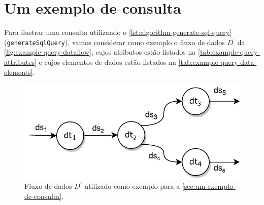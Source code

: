 \section{Um exemplo de consulta}%
\label{sec:um-exemplo-de-consulta}

Para ilustrar uma consulta utilizando o \autoref{lst:algorithm-generate-sql-query} (\texttt{generateSqlQuery}), vamos considerar como exemplo o fluxo de dados \(D^{\prime}\) da \autoref{fig:example-query-dataflow}, cujos atributos estão listados na \autoref{tab:example-query-attributes} e cujos elementos de dados estão listados na \autoref{tab:example-query-data-elements}.

\begin{figure}[htb]
    \centering
    \includegraphics[width=\textwidth]{img/example-query-dataflow}
    \caption[Fluxo de dados de exemplo]{Fluxo de dados \(D^{\prime}\) utilizado como exemplo para a \autoref{sec:um-exemplo-de-consulta}.}%
    \label{fig:example-query-dataflow}
\end{figure}

